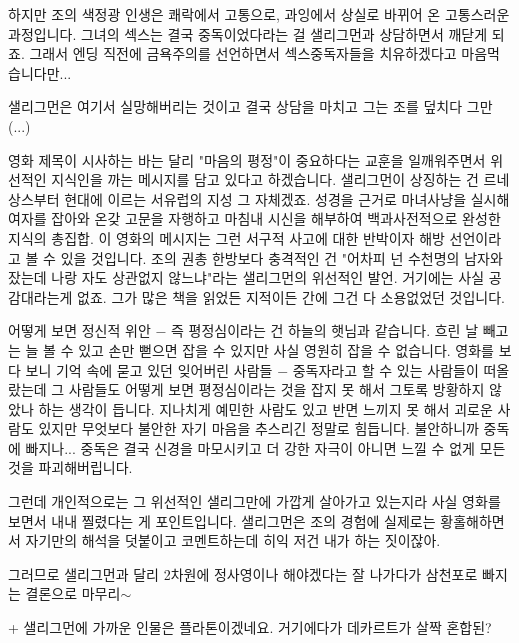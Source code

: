 하지만 조의 색정광 인생은 쾌락에서 고통으로, 과잉에서 상실로 바뀌어 온 고통스러운 과정입니다.
그녀의 섹스는 결국 중독이었다라는 걸 샐리그먼과 상담하면서 깨닫게 되죠.
그래서 엔딩 직전에 금욕주의를 선언하면서 섹스중독자들을 치유하겠다고 마음먹습니다만...
\vspace{5mm}

샐리그먼은 여기서 실망해버리는 것이고 결국 상담을 마치고 그는 조를 덮치다 그만(...)
\vspace{5mm}

영화 제목이 시사하는 바는 달리 "마음의 평정"이 중요하다는 교훈을 일깨워주면서 위선적인 지식인을 까는 메시지를 담고 있다고 하겠습니다.
샐리그먼이 상징하는 건 르네상스부터 현대에 이르는 서유럽의 지성 그 자체겠죠.
성경을 근거로 마녀사냥을 실시해 여자를 잡아와 온갖 고문을 자행하고 마침내 시신을 해부하여 백과사전적으로 완성한 지식의 총집합.
이 영화의 메시지는 그런 서구적 사고에 대한 반박이자 해방 선언이라고 볼 수 있을 것입니다.
조의 권총 한방보다 충격적인 건 "어차피 넌 수천명의 남자와 잤는데 나랑 자도 상관없지 않느냐"라는 샐리그먼의 위선적인 발언.
거기에는 사실 공감대라는게 없죠. 그가 많은 책을 읽었든 지적이든 간에 그건 다 소용없었던 것입니다.
\vspace{5mm}

어떻게 보면 정신적 위안 $-$ 즉 평정심이라는 건 하늘의 햇님과 같습니다.
흐린 날 빼고는 늘 볼 수 있고 손만 뻗으면 잡을 수 있지만 사실 영원히 잡을 수 없습니다.
영화를 보다 보니 기억 속에 묻고 있던 잊어버린 사람들 $-$ 중독자라고 할 수 있는 사람들이 떠올랐는데
그 사람들도 어떻게 보면 평정심이라는 것을 잡지 못 해서 그토록 방황하지 않았나 하는 생각이 듭니다.
지나치게 예민한 사람도 있고 반면 느끼지 못 해서 괴로운 사람도 있지만 무엇보다 불안한 자기 마음을 추스리긴 정말로 힘듭니다.
불안하니까 중독에 빠지나... 중독은 결국 신경을 마모시키고 더 강한 자극이 아니면 느낄 수 없게 모든 것을 파괴해버립니다.
\vspace{5mm}

그런데 개인적으로는 그 위선적인 샐리그만에 가깝게 살아가고 있는지라 사실 영화를 보면서 내내 찔렸다는 게 포인트입니다.
샐리그먼은 조의 경험에 실제로는 황홀해하면서 자기만의 해석을 덧붙이고 코멘트하는데 히익 저건 내가 하는 짓이잖아.
\vspace{5mm}

그러므로 샐리그먼과 달리 2차원에 정사영이나 해야겠다는 잘 나가다가 삼천포로 빠지는 결론으로 마무리$\sim$
\vspace{5mm}

+ 샐리그먼에 가까운 인물은 플라톤이겠네요. 거기에다가 데카르트가 살짝 혼합된?
\vspace{5mm}






